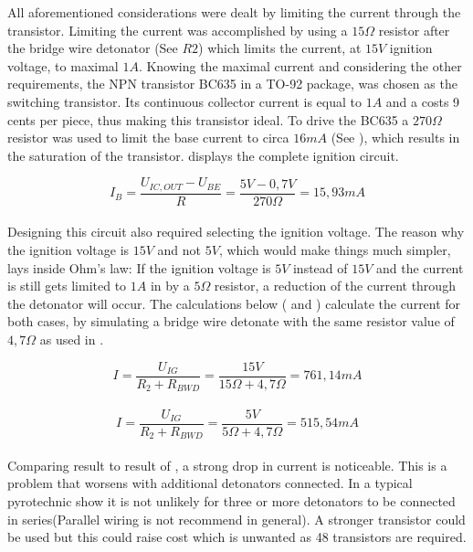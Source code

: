 \noindent All aforementioned considerations were dealt by limiting the current through the transistor. Limiting the current was  accomplished by using a $15\Omega$ resistor after the bridge wire detonator (See  $R2$) which limits the current, at $15V$ ignition voltage, to maximal $1A$. Knowing the maximal current and considering the other requirements, the NPN transistor BC635 in a TO-92 package, was chosen as the switching transistor. Its continuous collector current is equal to $1A$ and a costs 9 cents per piece, thus making this transistor ideal. To drive the BC635 a $270\Omega$ resistor was used to limit the base current to circa $16mA$ (See ), which results in the saturation of the transistor.  displays the complete ignition circuit.

\begin{equation}
I_B=\frac{U_{IC,OUT}-U_{BE}}{R}=\frac{5V-0,7V}{270\Omega}=15,93mA
\label{eq:base_current}
\end{equation}\\

\noindent Designing this circuit also required selecting the ignition voltage. The reason why the ignition voltage is $15V$ and not $5V$, which would make things much simpler, lays inside Ohm's law: If the ignition voltage is $5V$ instead of $15V$ and the current is still gets limited to $1A$ in by a $5\Omega$ resistor, a reduction of the current through the detonator will occur. The calculations below ( and ) calculate the current for both cases, by simulating a bridge wire detonate with the same resistor value of $4,7\Omega$ as used in .

\begin{equation}
I=\frac{U_{IG}}{R_2+R_{BWD}}=\frac{15V}{15\Omega+4,7\Omega}= 761,14mA
\label{eq:current_15v}
\end{equation}\\
\begin{equation}
I=\frac{U_{IG}}{R_2+R_{BWD}}=\frac{5V}{5\Omega+4,7\Omega}= 515,54mA
\label{eq:current_5v}
\end{equation}\\

\noindent Comparing result  to result of , a strong drop in current is noticeable. This is a problem that worsens with additional detonators connected. In a typical pyrotechnic show it is not unlikely for three or more detonators to be connected in series(Parallel wiring is not recommend in general). A stronger transistor could be used but this could raise cost which is unwanted as 48 transistors are required.\\

